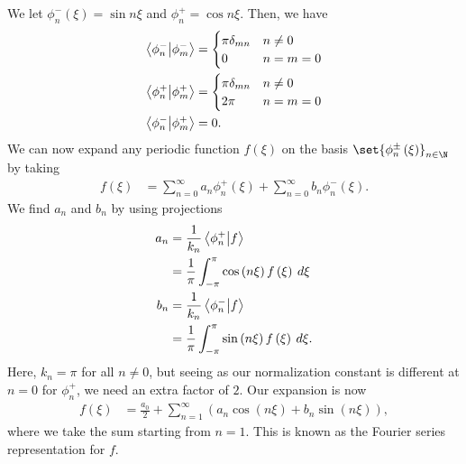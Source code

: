 \documentclass[10pt]{mypackage}
\begin{document}
We let $\phi_n^{-}\left(\xi\right) = \sin n\xi$ and $\phi_n^+ = \cos n\xi$. Then, we have
\begin{align*}
  \braket{\phi_n^-}{\phi_m^-} &= \begin{cases}
    \pi \delta_{mn} & n\neq 0\\
    0 & n=m=0
  \end{cases}\\
    \braket{\phi_n^+}{\phi_m^{+}} &= \begin{cases}
      \pi \delta_{mn} & n\neq 0\\
      2\pi & n=m=0
    \end{cases}\\
      \braket{\phi_n^{-}}{\phi_m^{+}} &= 0.
\end{align*}
We can now expand any periodic function $f\left(\xi\right)$ on the basis $\set{\phi_{n}^{\pm}\left(\xi\right)}_{n\in\N}$ by taking
\begin{align*}
  f\left(\xi\right) &= \sum_{n=0}^{\infty}a_n\phi_n^{+}\left(\xi\right) + \sum_{n=0}^{\infty}b_n\phi_n^{-}\left(\xi\right).
\end{align*}
We find $a_n$ and $b_n$ by using projections
\begin{align*}
  a_n &= \frac{1}{k_n} \braket{\phi_n^+}{f}\\
      &= \frac{1}{\pi}\int_{-\pi}^{\pi} \cos\left(n\xi\right)f\left(\xi\right)\:d\xi\\
  b_n &= \frac{1}{k_n} \braket{\phi_n^{-}}{f}\\
      &= \frac{1}{\pi} \int_{-\pi}^{\pi} \sin\left(n\xi\right)f\left(\xi\right)\:d\xi.
\end{align*}
Here, $k_n = \pi$ for all $n\neq 0$, but seeing as our normalization constant is different at $n=0$ for $\phi_n^{+}$, we need an extra factor of $2$. Our expansion is now
\begin{align*}
  f\left(\xi\right) &= \frac{a_0}{2} + \sum_{n=1}^{\infty}\left(a_n\cos\left(n\xi\right) + b_n\sin\left(n\xi\right)\right),
\end{align*}
where we take the sum starting from $n=1$. This is known as the Fourier series representation for $f$.
\end{document}
